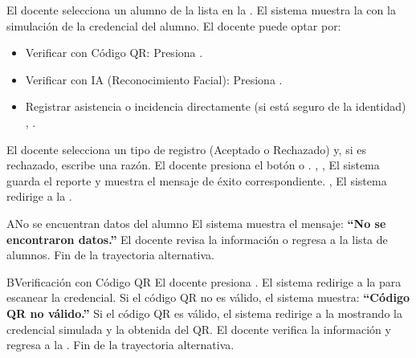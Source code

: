 \begin{UCtrayectoria}
	\UCpaso[\UCactor] El docente selecciona un alumno de la lista en la .
	\UCpaso El sistema muestra la  con la simulación de la credencial del alumno. 
	\UCpaso[\UCactor] El docente puede optar por:
	\begin{itemize}
		\item Verificar con Código QR: Presiona  .
		\item Verificar con IA (Reconocimiento Facial): Presiona  .
		\item Registrar asistencia o incidencia directamente (si está seguro de la identidad) , .
	\end{itemize}
	\UCpaso[\UCactor] El docente selecciona un tipo de registro (Aceptado o Rechazado) y, si es rechazado, escribe una razón. 
	\UCpaso[\UCactor] El docente presiona el botón  o . , , 
	\UCpaso El sistema guarda el reporte y muestra el mensaje de éxito correspondiente. , 
	\UCpaso El sistema redirige a la .
\end{UCtrayectoria}

\begin{UCtrayectoriaA}{A}{No se encuentran datos del alumno}
	\UCpaso El sistema muestra el mensaje: \textbf{ ``No se encontraron datos.''}
	\UCpaso[\UCactor] El docente revisa la información o regresa a la lista de alumnos.
	\UCpaso Fin de la trayectoria alternativa.
\end{UCtrayectoriaA}

\begin{UCtrayectoriaA}{B}{Verificación con Código QR}
	\UCpaso[\UCactor] El docente presiona .
	\UCpaso El sistema redirige a la  para escanear la credencial.
	\UCpaso Si el código QR no es válido, el sistema muestra: \textbf{ ``Código QR no válido.''}
	\UCpaso Si el código QR es válido, el sistema redirige a la  mostrando la credencial simulada y la obtenida del QR.
	\UCpaso[\UCactor] El docente verifica la información y regresa a la .
	\UCpaso Fin de la trayectoria alternativa.
\end{UCtrayectoriaA}

